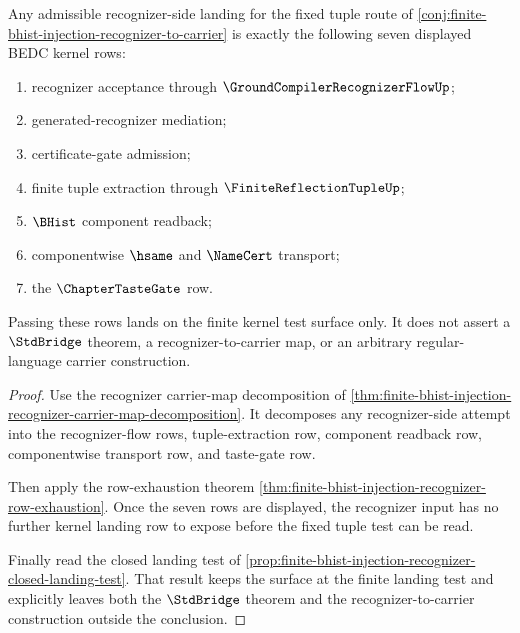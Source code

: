 \begin{theorem}
\label{thm:finite-bhist-injection-kernel-row-restatement}
Any admissible recognizer-side landing for the fixed tuple route of \autoref{conj:finite-bhist-injection-recognizer-to-carrier} is exactly the following seven displayed BEDC kernel rows:
\begin{enumerate}
\item recognizer acceptance through $\GroundCompilerRecognizerFlowUp$;
\item generated-recognizer mediation;
\item certificate-gate admission;
\item finite tuple extraction through $\FiniteReflectionTupleUp$;
\item $\BHist$ component readback;
\item componentwise $\hsame$ and $\NameCert$ transport;
\item the $\ChapterTasteGate$ row.
\end{enumerate}
Passing these rows lands on the finite kernel test surface only. It does not assert a $\StdBridge$ theorem, a recognizer-to-carrier map, or an arbitrary regular-language carrier construction.
\end{theorem}
\begin{proof}
Use the recognizer carrier-map decomposition of \autoref{thm:finite-bhist-injection-recognizer-carrier-map-decomposition}. It decomposes any recognizer-side attempt into the recognizer-flow rows, tuple-extraction row, component readback row, componentwise transport row, and taste-gate row.

Then apply the row-exhaustion theorem \autoref{thm:finite-bhist-injection-recognizer-row-exhaustion}. Once the seven rows are displayed, the recognizer input has no further kernel landing row to expose before the fixed tuple test can be read.

Finally read the closed landing test of \autoref{prop:finite-bhist-injection-recognizer-closed-landing-test}. That result keeps the surface at the finite landing test and explicitly leaves both the $\StdBridge$ theorem and the recognizer-to-carrier construction outside the conclusion.
\end{proof}

